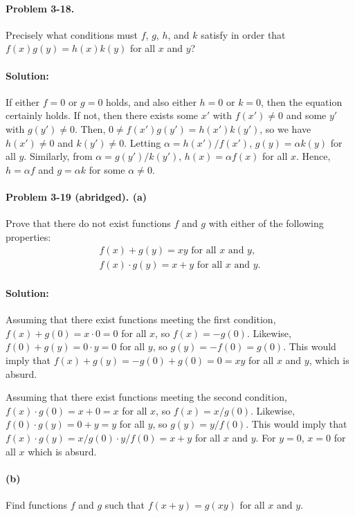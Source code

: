 \documentclass{article}
\begin{document}
\paragraph{Problem 3-18.} Precisely what conditions must $f$, $g$, $h$, and $k$
satisfy in order that $f(x)g(y) = h(x)k(y)$ for all $x$ and $y$?

\paragraph{Solution:} If either $f = 0$ or $g = 0$ holds, and also either
$h = 0$ or $k = 0$, then the equation certainly holds. If not, then there
exists some $x'$ with $f(x') \neq 0$ and some $y'$ with $g(y') \neq 0$. Then,
$0 \neq f(x')g(y') = h(x')k(y')$, so we have $h(x') \neq 0$ and $k(y') \neq 0$.
Letting $\alpha = h(x')/f(x')$, $g(y) = \alpha k(y)$ for all $y$. Similarly,
from $\alpha = g(y')/k(y')$, $h(x) = \alpha f(x)$ for all $x$. Hence, $h =
\alpha f$ and $g = \alpha k$ for some $\alpha \neq 0$.

\paragraph{Problem 3-19 (abridged). (a)} Prove that there do not exist
functions $f$ and $g$ with either of the following properties: \begin{align*}
  f(x) + g(y) = xy \text{ for all } x \text{ and } y, \\
  f(x) \cdot g(y) = x + y \text{ for all } x \text{ and } y.
\end{align*}

\paragraph{Solution:} Assuming that there exist functions meeting the first
condition, $f(x) + g(0) = x \cdot 0 = 0$ for all $x$, so $f(x) = -g(0)$.
Likewise, $f(0) + g(y) = 0 \cdot y = 0$ for all $y$, so $g(y) = -f(0) = g(0)$.
This would imply that $f(x) + g(y) = -g(0) + g(0) = 0 = xy$ for all $x$ and
$y$, which is absurd.

Assuming that there exist functions meeting the second condition, $f(x) \cdot
g(0) = x + 0 = x$ for all $x$, so $f(x) = x/g(0)$. Likewise, $f(0) \cdot g(y) =
0 + y = y$ for all $y$, so $g(y) = y/f(0)$. This would imply that $f(x) \cdot
g(y) = x/g(0) \cdot y/f(0) = x + y$ for all $x$ and $y$. For $y = 0$, $x = 0$
for all $x$ which is absurd.

\paragraph{(b)} Find functions $f$ and $g$ such that $f(x + y) = g(xy)$ for all
$x$ and $y$.
\end{document}
